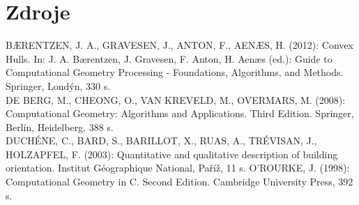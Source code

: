 \documentclass{article}
\begin{document}
\section{\large{Zdroje}}
BÆRENTZEN, J. A., GRAVESEN, J., ANTON, F., AENÆS, H. (2012): Convex Hulls. In: J. A. Bærentzen, J. Gravesen, F. Anton, H. Aenæs (ed.): Guide to Computational Geometry Processing - Foundations, Algorithms, and Methods. Springer, Londýn, 330 s.\\
DE BERG, M., CHEONG, O., VAN KREVELD, M., OVERMARS, M. (2008): Computational Geometry: Algorithms and Applications. Third Edition. Springer, Berlín, Heidelberg, 388 s.\\
DUCHÉNE, C., BARD, S., BARILLOT, X., RUAS, A., TRÉVISAN, J., HOLZAPFEL, F. (2003): Quantitative and qualitative description of building orientation. Institut Géographique National, Paříž, 11 s.
O'ROURKE, J. (1998): Computational Geometry in C. Second Edition. Cambridge University Press, 392 s.\\
\end{document}
